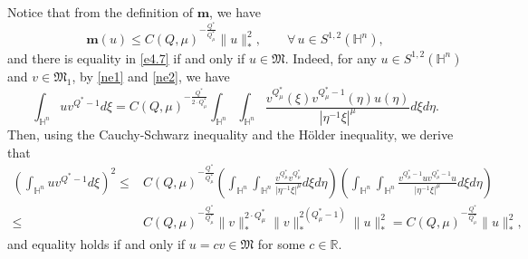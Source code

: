 \documentclass[10pt,a4paper]{amsart}
\begin{document}
Notice that from the definition of $\mathbf{m}$, we have
\begin{equation}\label{e4.7}
 {\mathbf{m}(u)\leq C(Q,\mu)^{-\frac{Q^{\ast}}{Q^{\ast}_{\mu}}}\|u\|_*^2,\qquad \forall \, u\in S^{1,2}(\mathbb{H}^{n}),}
\end{equation}
and there is equality in \eqref{e4.7} if and only if $u\in \mathfrak{M}$. Indeed, for any $u\in S^{1,2}(\mathbb{H}^{n})$ and $v\in \mathfrak{M}_1$, by \eqref{ne1} and \eqref{ne2},
we have
\begin{equation*}
 \int_{\mathbb{H}^{n}} u v^{Q^{\ast}-1}d\xi=C(Q,\mu)^{-\frac{Q^{\ast}}{2\cdot Q^{\ast}_{\mu}}}
 \int_{\mathbb{H}^{n}}\int_{\mathbb{H}^{n}}
 \frac{v^{Q^{\ast}_{\mu}}(\xi)v^{Q^{\ast}_{\mu}-1}(\eta)u(\eta)}{|\eta^{-1}\xi|^{\mu}}d\xi{d}\eta.
\end{equation*}
Then, using
 the Cauchy-Schwarz inequality and the H\"{o}lder inequality, we derive that
\begin{align*}
 \left(\int_{\mathbb{H}^{n}} u v^{Q^{\ast}-1}d\xi\right)^2\leq& C(Q,\mu)^{-\frac{Q^{\ast}}{Q^{\ast}_{\mu}}}
 \left(\int_{\mathbb{H}^{n}}\int_{\mathbb{H}^{n}}
 \frac{v^{Q^{\ast}_{\mu}}v^{Q^{\ast}_{\mu}}}{|\eta^{-1}\xi|^{\mu}}d\xi{d}\eta\right)\left(\int_{\mathbb{H}^{n}}\int_{\mathbb{H}^{n}}
 \frac{v^{Q^{\ast}_{\mu}-1}uv^{Q^{\ast}_{\mu}-1}u}{|\eta^{-1}\xi|^{\mu}}d\xi{d}\eta\right)
 \\ \leq& C(Q,\mu)^{-\frac{Q^{\ast}}{Q^{\ast}_{\mu}}} \|v\|_*^{2\cdot Q^{\ast}_{\mu}}\|v\|_*^{2( Q^{\ast}_{\mu}-1)}\|u\|_*^{2}
 =C(Q,\mu)^{-\frac{Q^{\ast}}{Q^{\ast}_{\mu}}}\|u\|_*^{2},
\end{align*}
and equality holds if and only if $u=cv\in \mathfrak{M}$ for some $c\in \mathbb{R}$.
\end{document}
